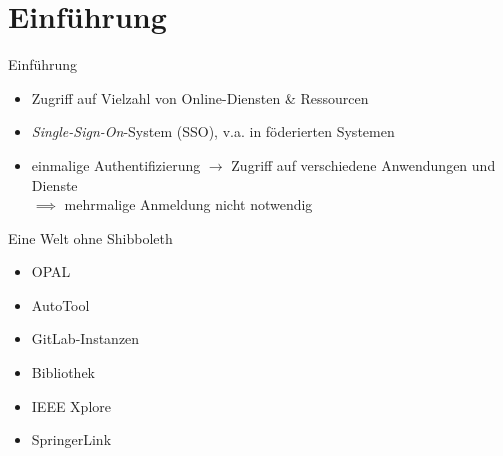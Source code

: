 
{
    \section{Einführung}
}

\begin{frame}{Einführung}
    \begin{itemize}
        \item Zugriff auf Vielzahl von Online-Diensten \& Ressourcen
        \item \emph{Single-Sign-On}-System (SSO), v.a. in föderierten Systemen

        \pause

        \item \alert{einmalige} Authentifizierung $\to$ Zugriff auf verschiedene Anwendungen und Dienste \\
            $\implies$ mehrmalige Anmeldung nicht notwendig \cite{switchIntroductionSWITCHaai2024}
    \end{itemize}
\end{frame}

\begin{frame}{Eine Welt ohne Shibboleth}
    \begin{itemize}
        \item OPAL
        \item AutoTool
        \item GitLab-Instanzen
        \item Bibliothek
        \item IEEE Xplore
        \item SpringerLink \cite{hochschulefuertechnikwirtschaftundkulturleipzigMedienOnlineNutzen}
    \end{itemize}
\end{frame}


